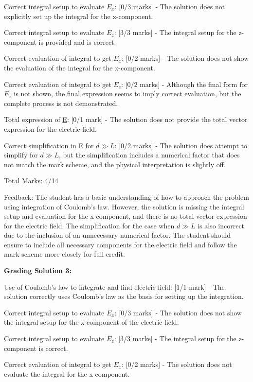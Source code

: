 \documentclass[a4paper,11pt]{article}
\begin{document}
Correct integral setup to evaluate \( E_x \): [0/3 marks] - The solution does not explicitly set up the integral for the x-component.

Correct integral setup to evaluate \( E_z \): [3/3 marks] - The integral setup for the z-component is provided and is correct.

Correct evaluation of integral to get \( E_x \): [0/2 marks] - The solution does not show the evaluation of the integral for the x-component.

Correct evaluation of integral to get \( E_z \): [0/2 marks] - Although the final form for \( E_z \) is not shown, the final expression seems to imply correct evaluation, but the complete process is not demonstrated.

Total expression of \underline{E}: [0/1 mark] - The solution does not provide the total vector expression for the electric field.

Correct simplification in \underline{E} for \( d \gg L \): [0/2 marks] - The solution does attempt to simplify for \( d \gg L \), but the simplification includes a numerical factor that does not match the mark scheme, and the physical interpretation is slightly off.

Total Marks: 4/14

Feedback:
The student has a basic understanding of how to approach the problem using integration of Coulomb's law. However, the solution is missing the integral setup and evaluation for the x-component, and there is no total vector expression for the electric field. The simplification for the case when \( d \gg L \) is also incorrect due to the inclusion of an unnecessary numerical factor. The student should ensure to include all necessary components for the electric field and follow the mark scheme more closely for full credit.

\textbf{Grading Solution 3:}

Use of Coulomb’s law to integrate and find electric field: [1/1 mark] - The solution correctly uses Coulomb's law as the basis for setting up the integration.

Correct integral setup to evaluate \( E_x \): [0/3 marks] - The solution does not show the integral setup for the x-component of the electric field.

Correct integral setup to evaluate \( E_z \): [3/3 marks] - The integral setup for the z-component is correct.

Correct evaluation of integral to get \( E_x \): [0/2 marks] - The solution does not evaluate the integral for the x-component.
\end{document}
